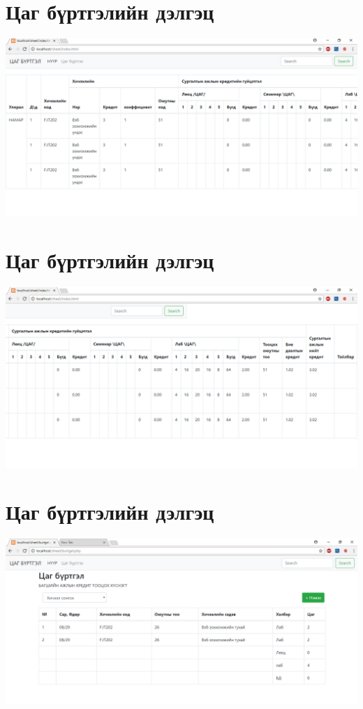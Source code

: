 \documentclass[12pd]{article}
\begin{document}
	\section{Цаг бүртгэлийн дэлгэц}
	\includegraphics[width=\textwidth]{delgets1}
	\section{Цаг бүртгэлийн дэлгэц}
	\includegraphics[width=\textwidth]{delgets2}
	\section{Цаг бүртгэлийн дэлгэц}
	\includegraphics[width=\textwidth]{delgets3}
\end{document}
